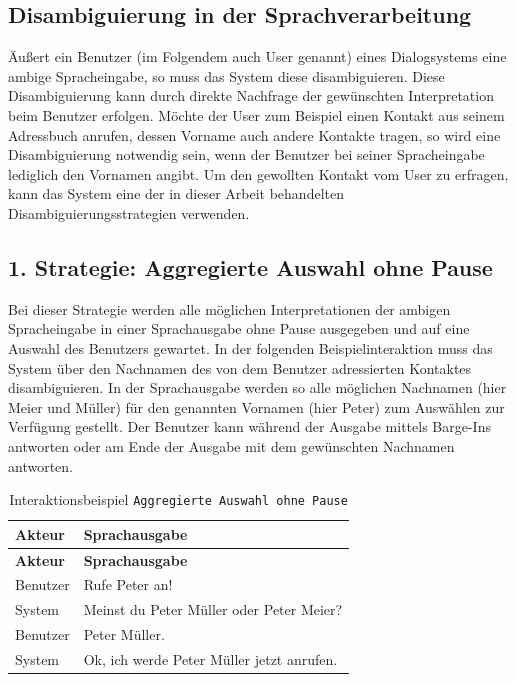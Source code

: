 \documentclass[12pt,a4paper]{scrartcl}
\begin{document}
\subsection{Disambiguierung in der Sprachverarbeitung}
Äußert ein Benutzer (im Folgendem auch User genannt) eines Dialogsystems eine ambige Spracheingabe, so muss das System diese disambiguieren. Diese Disambiguierung kann durch direkte Nachfrage der gewünschten Interpretation beim Benutzer erfolgen. 
Möchte der User zum Beispiel einen Kontakt aus seinem Adressbuch anrufen, dessen Vorname auch andere Kontakte tragen, so wird eine Disambiguierung notwendig sein, wenn der Benutzer bei seiner Spracheingabe lediglich den Vornamen angibt. Um den gewollten Kontakt vom User zu erfragen, kann das System eine der in dieser Arbeit behandelten Disambiguierungsstrategien verwenden. 
\subsection{1. Strategie: Aggregierte Auswahl ohne Pause}
Bei dieser Strategie werden alle möglichen Interpretationen der ambigen Spracheingabe in einer Sprachausgabe ohne Pause ausgegeben und auf eine Auswahl des Benutzers gewartet. In der folgenden  Beispielinteraktion muss das System über den Nachnamen des von dem Benutzer adressierten Kontaktes disambiguieren. In der Sprachausgabe werden so alle möglichen Nachnamen (hier Meier und Müller) für den genannten Vornamen (hier Peter) zum Auswählen zur Verfügung gestellt. Der Benutzer kann während der Ausgabe mittels Barge-Ins antworten oder am Ende der Ausgabe mit dem gewünschten Nachnamen antworten. 


\begin{longtable}{p{6cm}p{8cm}}
	\caption[Interaktionsbeispiel \texttt{Aggregierte Auswahl ohne Pause}]{Interaktionsbeispiel \texttt{Aggregierte Auswahl ohne Pause}}\\
	\hline
	\textbf{Akteur} &	\textbf{Sprachausgabe}\\
	\hline
	\endfirsthead
	\hline
	\textbf{Akteur} &	\textbf{Sprachausgabe}\\
	\hline
	\endhead
Benutzer & Rufe Peter an!\\
System & Meinst du Peter Müller oder Peter Meier?\\
Benutzer & Peter Müller.\\
System & Ok, ich werde Peter Müller jetzt anrufen.\\

\hline
\end{longtable}
	
\end{document}
